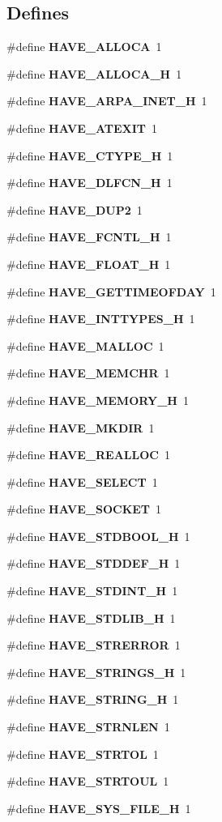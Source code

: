 \subsection*{Defines}
\begin{DoxyCompactItemize}
\item 
\#define {\bf HAVE\_\-ALLOCA}~1
\item 
\#define {\bf HAVE\_\-ALLOCA\_\-H}~1
\item 
\#define {\bf HAVE\_\-ARPA\_\-INET\_\-H}~1
\item 
\#define {\bf HAVE\_\-ATEXIT}~1
\item 
\#define {\bf HAVE\_\-CTYPE\_\-H}~1
\item 
\#define {\bf HAVE\_\-DLFCN\_\-H}~1
\item 
\#define {\bf HAVE\_\-DUP2}~1
\item 
\#define {\bf HAVE\_\-FCNTL\_\-H}~1
\item 
\#define {\bf HAVE\_\-FLOAT\_\-H}~1
\item 
\#define {\bf HAVE\_\-GETTIMEOFDAY}~1
\item 
\#define {\bf HAVE\_\-INTTYPES\_\-H}~1
\item 
\#define {\bf HAVE\_\-MALLOC}~1
\item 
\#define {\bf HAVE\_\-MEMCHR}~1
\item 
\#define {\bf HAVE\_\-MEMORY\_\-H}~1
\item 
\#define {\bf HAVE\_\-MKDIR}~1
\item 
\#define {\bf HAVE\_\-REALLOC}~1
\item 
\#define {\bf HAVE\_\-SELECT}~1
\item 
\#define {\bf HAVE\_\-SOCKET}~1
\item 
\#define {\bf HAVE\_\-STDBOOL\_\-H}~1
\item 
\#define {\bf HAVE\_\-STDDEF\_\-H}~1
\item 
\#define {\bf HAVE\_\-STDINT\_\-H}~1
\item 
\#define {\bf HAVE\_\-STDLIB\_\-H}~1
\item 
\#define {\bf HAVE\_\-STRERROR}~1
\item 
\#define {\bf HAVE\_\-STRINGS\_\-H}~1
\item 
\#define {\bf HAVE\_\-STRING\_\-H}~1
\item 
\#define {\bf HAVE\_\-STRNLEN}~1
\item 
\#define {\bf HAVE\_\-STRTOL}~1
\item 
\#define {\bf HAVE\_\-STRTOUL}~1
\item 
\#define {\bf HAVE\_\-SYS\_\-FILE\_\-H}~1

\end{DoxyCompactItemize}
